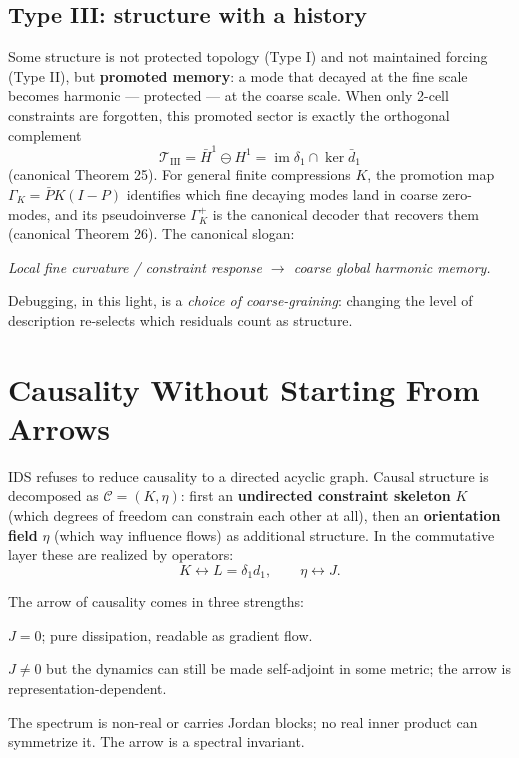 \documentclass[11pt,a4paper]{article}
\newenvironment{canonbox}{\begin{mdframed}[style=canon]\itshape}{\end{mdframed}}
\theoremstyle{plain}
\begin{document}
\subsection{Type III: structure with a history}\label{sec:typeiii}

Some structure is not protected topology (Type I) and not maintained forcing (Type II), but \textbf{promoted memory}: a mode that decayed at the fine scale becomes harmonic --- protected --- at the coarse scale. When only 2-cell constraints are forgotten, this promoted sector is exactly the orthogonal complement
\begin{equation}
\boxed{\ \mathcal T_{\mathrm{III}}=\bar H^1\ominus H^1=\operatorname{im}\delta_1\cap\ker\bar d_1\ }
\end{equation}
(canonical Theorem 25). For general finite compressions $K$, the promotion map $\Gamma_K=\bar PK(I-P)$ identifies which fine decaying modes land in coarse zero-modes, and its pseudoinverse $\Gamma_K^+$ is the canonical decoder that recovers them (canonical Theorem 26). The canonical slogan:

\begin{canonbox}
Local fine curvature / constraint response $\longrightarrow$ coarse global harmonic memory.
\end{canonbox}

Debugging, in this light, is a \emph{choice of coarse-graining}: changing the level of description re-selects which residuals count as structure.

\section{Causality Without Starting From Arrows}\label{sec:causality}

IDS refuses to reduce causality to a directed acyclic graph. Causal structure is decomposed as $\mathcal C=(K,\eta)$: first an \textbf{undirected constraint skeleton} $K$ (which degrees of freedom can constrain each other at all), then an \textbf{orientation field} $\eta$ (which way influence flows) as additional structure. In the commutative layer these are realized by operators:
\begin{equation}
K\leftrightarrow L=\delta_1d_1,\qquad \eta\leftrightarrow J.
\end{equation}

The arrow of causality comes in three strengths:
\begin{description}[itemsep=1pt,topsep=3pt]
\item[Level 0 --- no arrow.] $J=0$; pure dissipation, readable as gradient flow.
\item[Level 1 --- metric-relative arrow.] $J\ne0$ but the dynamics can still be made self-adjoint in some metric; the arrow is representation-dependent.
\item[Level 2 --- intrinsic arrow.] The spectrum is non-real or carries Jordan blocks; no real inner product can symmetrize it. The arrow is a spectral invariant.
\end{description}
\end{document}
